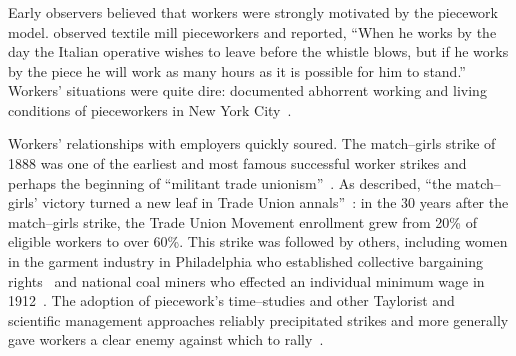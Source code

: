 \documentclass[trackingWork]{subfiles}
\begin{document}



\subsubsection{\pieceworkpers}
Early observers believed that workers were strongly motivated by the piecework model.
\citeauthor{clark1908cotton} observed textile mill pieceworkers and reported,
``When he works by the day the Italian operative wishes to leave before the whistle blows,
but if he works by the piece he will work as many hours as it is possible for him to stand.''
Workers' situations were quite dire: \citeauthor{riisOtherSideLives}  documented abhorrent working and living conditions of pieceworkers in New York City~\cite{riisOtherSideLives}.

Workers' relationships with employers quickly soured.
The match--girls strike of 1888 was one of the earliest and most famous successful worker strikes and perhaps the beginning of ``militant trade unionism''~\cite{10.2307/3827491}.
As \citeauthor{weyer1894history} described, ``the match--girls' victory turned a new leaf in Trade Union annals''~\cite{weyer1894history}: in the 30 years after the match--girls strike, the Trade Union Movement enrollment grew from 20\% of eligible workers to over 60\%.
This strike was followed by others, including women in the garment industry in Philadelphia who established collective bargaining rights~\cite{10.2307/41829256} and national coal miners who effected an individual minimum wage in 1912~\cite{10.2307/2221944}.
The adoption of piecework's time--studies and other Taylorist and scientific management approaches reliably precipitated strikes and more generally gave workers a clear enemy against which to rally~\cite{jacoby1983union}.
\end{document}
